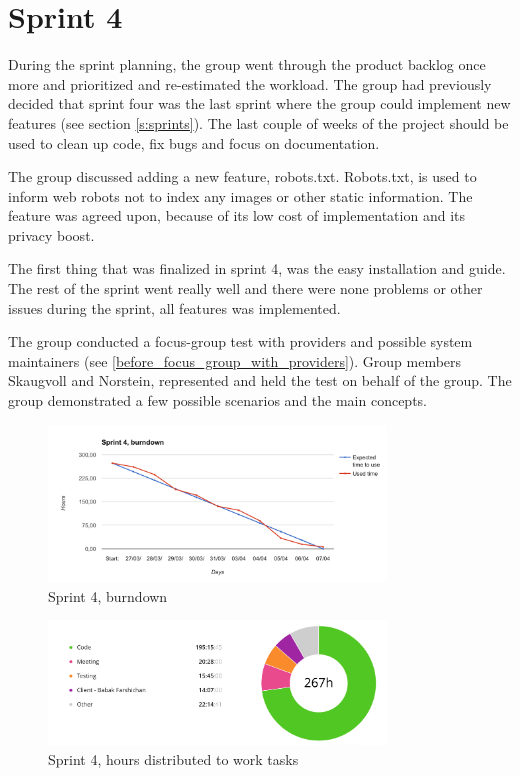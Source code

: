 \section{Sprint 4}
\label{Sprints-sprint4}

During the sprint planning, the group went through the product backlog once more and prioritized and re-estimated the workload. The group had previously decided that sprint four was the last sprint where the group could implement new features (see section \ref{s:sprints}). The last couple of weeks of the project should be used to clean up code, fix bugs and focus on documentation. 

The group discussed adding a new feature, robots.txt. Robots.txt, is used to inform web robots not to index any images or other static information. The feature was agreed upon, because of its low cost of implementation and its privacy boost. 

The first thing that was finalized in sprint 4, was the easy installation and guide. The rest of the sprint went really well and there were none problems or other issues during the sprint, all features was implemented.

The group conducted a focus-group test with providers and possible system maintainers (see \ref{before_focus_group_with_providers}). Group members Skaugvoll and Norstein, represented and held the test on behalf of the group. The group demonstrated a few possible scenarios and the main concepts. 


\begin{figure}[ht]
\centering
    \includegraphics[width=0.8\textwidth]{fig/sprint4}
\caption{Sprint 4, burndown}
\end{figure}

\begin{figure}[ht]
\centering
    \includegraphics[width=0.8\textwidth]{fig/sprint4-diagram}
\caption{Sprint 4, hours distributed to work tasks}
\end{figure}

